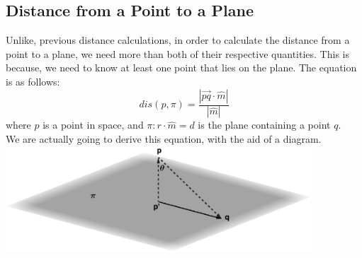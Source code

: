 \documentclass[hidelinks, a4paper, 12pt]{article}
\newcommand{\mhat}{\hat{m}}
\newcommand{\n}{\\[\baselineskip]}
\begin{document}
        \subsection{Distance from a Point to a Plane}
            Unlike, previous distance calculations, in order to calculate the distance from a point to a plane, we need more than both of their respective
            quantities. This is because, we need to know at least one point that lies on the plane. The equation is as follows:
            \[dis(p, \pi) = \frac{|\vec{pq}\cdot\mhat|}{|\mhat|}\]
            where $p$ is a point in space, and $\pi:r\cdot \mhat = d$ is the plane containing a point $q$.\n
            We are actually going to derive this equation, with the aid of a diagram.\n
            \includegraphics[width=11.4cm, height=4cm]{point-plane-distance}
\end{document}
